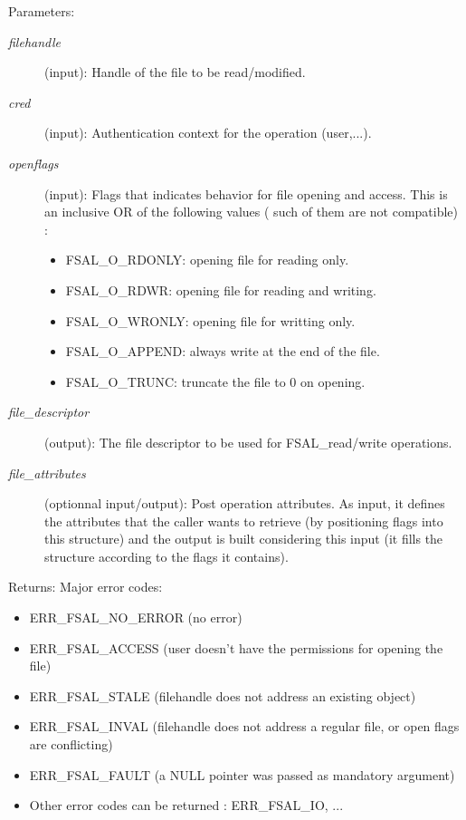 \begin{Desc}
\item[Parameters:]
\begin{description}
\item[{\em filehandle}](input): Handle of the file to be read/modified. \item[{\em cred}](input): Authentication context for the operation (user,...). \item[{\em openflags}](input): Flags that indicates behavior for file opening and access. This is an inclusive OR of the following values ( such of them are not compatible) :\begin{itemize}
\item FSAL\_\-O\_\-RDONLY: opening file for reading only.\item FSAL\_\-O\_\-RDWR: opening file for reading and writing.\item FSAL\_\-O\_\-WRONLY: opening file for writting only.\item FSAL\_\-O\_\-APPEND: always write at the end of the file.\item FSAL\_\-O\_\-TRUNC: truncate the file to 0 on opening. \end{itemize}
\item[{\em file\_\-descriptor}](output): The file descriptor to be used for FSAL\_\-read/write operations. \item[{\em file\_\-attributes}](optionnal input/output): Post operation attributes. As input, it defines the attributes that the caller wants to retrieve (by positioning flags into this structure) and the output is built considering this input (it fills the structure according to the flags it contains).\end{description}
\end{Desc}
\begin{Desc}
\item[Returns:]Major error codes:\begin{itemize}
\item ERR\_\-FSAL\_\-NO\_\-ERROR (no error)\item ERR\_\-FSAL\_\-ACCESS (user doesn't have the permissions for opening the file)\item ERR\_\-FSAL\_\-STALE (filehandle does not address an existing object)\item ERR\_\-FSAL\_\-INVAL (filehandle does not address a regular file, or open flags are conflicting)\item ERR\_\-FSAL\_\-FAULT (a NULL pointer was passed as mandatory argument)\item Other error codes can be returned : ERR\_\-FSAL\_\-IO, ... \end{itemize}
\end{Desc}


